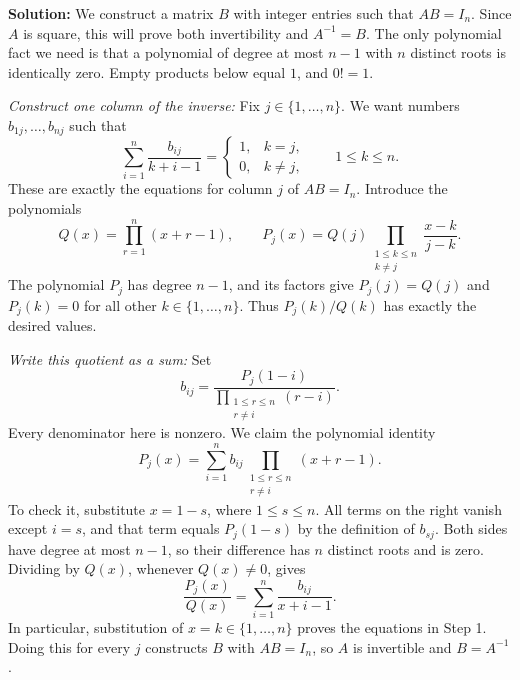 \documentclass[a4paper,11pt,abstract=true]{scrartcl}
\theoremstyle{dotlessP}
\theoremstyle{dotlessS}
\theoremstyle{remark}
\theoremstyle{definition}
\begin{document}
\begin{claim_box}
\textbf{Solution:} We construct a matrix
$B$ with integer entries such that $AB=I_n$. Since $A$ is square,
this will prove both invertibility and $A^{-1}=B$. The only polynomial
fact we need is that a polynomial of degree at most $n-1$ with $n$
distinct roots is identically zero. Empty products below equal $1$,
and $0!=1$.

\emph{Construct one column of the inverse:} Fix
$j\in\{1,\ldots,n\}$. We want numbers $b_{1j},\ldots,b_{nj}$ such that
\[
\sum_{i=1}^n\frac{b_{ij}}{k+i-1}
=\begin{cases}1,&k=j,\\0,&k\neq j,\end{cases}
\qquad 1\leq k\leq n.
\]
These are exactly the equations for column $j$ of $AB=I_n$.
Introduce the polynomials
\[
Q(x)=\prod_{r=1}^n(x+r-1),\qquad
P_j(x)=Q(j)\prod_{\substack{1\leq k\leq n\\k\neq j}}
\frac{x-k}{j-k}.
\]
The polynomial $P_j$ has degree $n-1$, and its factors give
$P_j(j)=Q(j)$ and $P_j(k)=0$ for all other $k\in\{1,\ldots,n\}$.
Thus $P_j(k)/Q(k)$ has exactly the desired values.

\emph{Write this quotient as a sum:} Set
\[
b_{ij}=\frac{P_j(1-i)}{
\displaystyle\prod_{\substack{1\leq r\leq n\\r\neq i}}(r-i)}.
\]
Every denominator here is nonzero. We claim the polynomial identity
\[
P_j(x)=\sum_{i=1}^n b_{ij}
\prod_{\substack{1\leq r\leq n\\r\neq i}}(x+r-1).
\]
To check it, substitute $x=1-s$, where $1\leq s\leq n$.
All terms on the right vanish except $i=s$, and that term equals
$P_j(1-s)$ by the definition of $b_{sj}$. Both sides have degree
at most $n-1$, so their difference has $n$ distinct roots and is zero.
Dividing by $Q(x)$, whenever $Q(x)\neq0$, gives
\[
\frac{P_j(x)}{Q(x)}=\sum_{i=1}^n\frac{b_{ij}}{x+i-1}.
\]
In particular, substitution of $x=k\in\{1,\ldots,n\}$ proves the
equations in Step 1. Doing this for every $j$ constructs $B$ with
$AB=I_n$, so $A$ is invertible and $B=A^{-1}$.


\end{claim_box}
\end{document}
